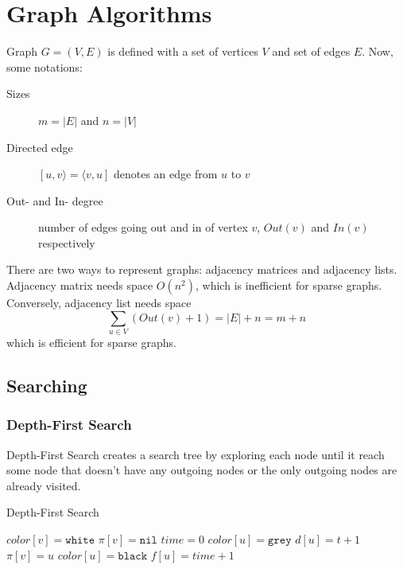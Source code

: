 
\section{Graph Algorithms}
Graph $G=(V,E)$ is defined with a set of vertices $V$ and set of edges $E$.
Now, some notations:
\begin{description}
  \item[Sizes] $m=|E|$ and $n=|V|$
  \item[Directed edge] $[u,v\rangle=\langle v,u]$ denotes an edge from $u$ to
    $v$
  \item[Out- and In- degree] number of edges going out and in of vertex $v$,
    $Out(v)$ and $In(v)$ respectively
\end{description}

There are two ways to represent graphs: adjacency matrices and adjacency lists.
Adjacency matrix needs space $O(n^2)$, which is inefficient for sparse graphs.
Conversely, adjacency list needs space $$\sum_{u\in V} (Out(v) + 1)=|E|+n=m+n$$
which is efficient for sparse graphs.


\subsection{Searching}
\subsubsection{Depth-First Search}
Depth-First Search creates a search tree by exploring each node until it reach
some node that doesn't have any outgoing nodes or the only outgoing nodes are
already visited.
\begin{algorithm}
  \caption{Depth-First Search}\label{graph:dfs}
  \begin{algorithmic}
      \State $color[v]=\texttt{white}$
      \State $\pi[v]=\texttt{nil}$
    \EndFor
    \State $time = 0$
        \State{}
      \EndIf
    \EndFor
    \EndFunction
    \State
      \State $color[u]=\texttt{grey}$
      \State $d[u]=t+1$
        \State{}
        \State $\pi[v]=u$
      \EndIf
      \State $color[u]=\texttt{black}$
      \State $f[u]=time+1$
      \EndFor
    \EndFunction
  \end{algorithmic}
\end{algorithm}



